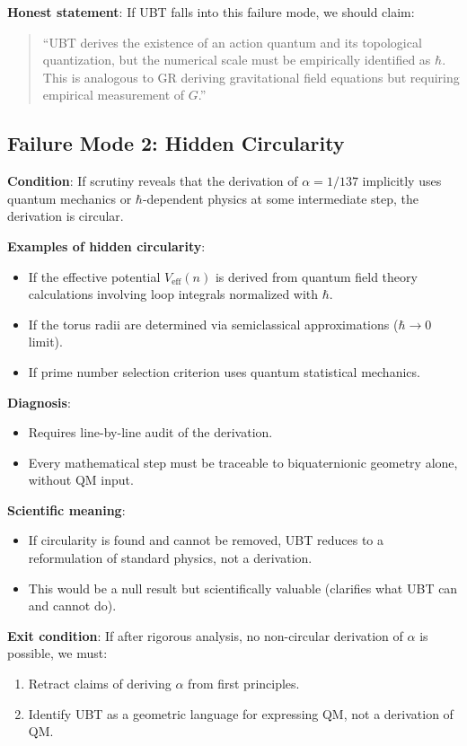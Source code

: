 \documentclass[12pt]{article}
\begin{document}
\textbf{Honest statement}: If UBT falls into this failure mode, we should claim:
\begin{quote}
``UBT derives the existence of an action quantum and its topological quantization, but the numerical scale must be empirically identified as $\hbar$. This is analogous to GR deriving gravitational field equations but requiring empirical measurement of $G$.''
\end{quote}

\subsection{Failure Mode 2: Hidden Circularity}

\textbf{Condition}: If scrutiny reveals that the derivation of $\alpha = 1/137$ implicitly uses quantum mechanics or $\hbar$-dependent physics at some intermediate step, the derivation is circular.

\textbf{Examples of hidden circularity}:
\begin{itemize}
\item If the effective potential $V_{\text{eff}}(n)$ is derived from quantum field theory calculations involving loop integrals normalized with $\hbar$.
\item If the torus radii are determined via semiclassical approximations ($\hbar \to 0$ limit).
\item If prime number selection criterion uses quantum statistical mechanics.
\end{itemize}

\textbf{Diagnosis}:
\begin{itemize}
\item Requires line-by-line audit of the derivation.
\item Every mathematical step must be traceable to biquaternionic geometry alone, without QM input.
\end{itemize}

\textbf{Scientific meaning}:
\begin{itemize}
\item If circularity is found and cannot be removed, UBT reduces to a reformulation of standard physics, not a derivation.
\item This would be a null result but scientifically valuable (clarifies what UBT can and cannot do).
\end{itemize}

\textbf{Exit condition}: If after rigorous analysis, no non-circular derivation of $\alpha$ is possible, we must:
\begin{enumerate}
\item Retract claims of deriving $\alpha$ from first principles.
\item Identify UBT as a geometric language for expressing QM, not a derivation of QM.
\end{enumerate}
\end{document}
